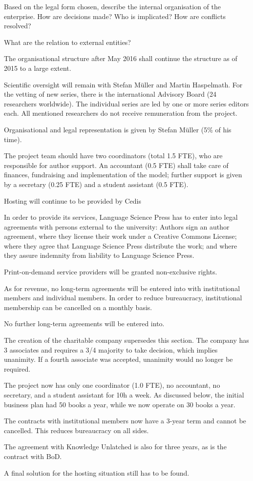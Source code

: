 \documentclass[nonflat,smallfont
]{langsci/langscibook}
\newcommand{\background}[1]{ 
  \vspace{5mm}
  \renewcommand{\tblslinecolour}{lsDarkBlue}
  \tblssy[red]{explore2}{Background}{\vspace*{-5mm}#1}
}
\newcommand{\langscisolution}[1]{
  \renewcommand{\tblslinecolour}{lsLightBlue}
  \tblssy{langsci}{LangSci solution}{\vspace*{-5mm}#1}
}
\newcommand{\evaluation}[1]{
  \renewcommand{\tblslinecolour}{lsLightOrange}
  \tblssy{receipt}{Evaluation}{\vspace*{-5mm}#1}
}
\renewcommand{\tblssy}[4][black!12]{%
  \renewcommand{\langscisymbol}{#2}\renewcommand{\tblsboxcolor}{#1}
  \begin{mdframed}[style=yellowexercise,frametitle={#3}]
    #4
  \end{mdframed}
}
\begin{document}
\background{Based on the legal form chosen, describe the internal organisation of the enterprise. How are decisions made? Who is implicated? How are conflicts resolved?

What are the relation to external entities?}
\langscisolution{

The organisational structure after May 2016 shall continue the structure as of 2015 to a large extent.

Scientific oversight will remain with Stefan Müller and Martin Haspelmath. For the vetting of new series, there is the international Advisory Board (24 researchers worldwide). The individual series are led by one or more series editors each. All mentioned researchers do not receive remuneration from the project. 

Organisational and legal representation is given by Stefan Müller (5\% of his time).

The project team should have two coordinators (total 1.5 FTE), who are responsible for author support. An accountant (0.5 FTE) shall take care of finances, fundraising and implementation of the model; further support is given by a secretary (0.25 FTE) and a student assistant (0.5 FTE). 

Hosting will continue to be provided by Cedis

In order to provide its services, Language Science Press has to enter into legal agreements with persons external to the university: Authors sign an author agreement, where they license their work under a Creative Commons License; where they agree that Language Science Press distribute the work; and where they assure indemnity from liability to Language Science Press.

Print-on-demand service providers will be granted non-exclu\-sive rights. 

As for revenue, no long-term agreements will be entered into with institutional members and individual members. In order to reduce bureaucracy, institutional membership can be cancelled on a monthly basis. 

No further long-term agreements will be entered into. 

}
\evaluation{
The creation of the charitable company supersedes this section. The company has 3 associates and requires a 3/4 majority to take decision, which implies unanimity. If a fourth associate was accepted, unanimity would no longer be required.

The project now has only one coordinator (1.0 FTE), no accountant, no secretary, and a student assistant for 10h a week. As discussed below, the initial business plan had 50 books a year, while we now operate on 30 books a year.

The contracts with institutional members now have a 3-year term and cannot be cancelled. This reduces bureaucracy on all sides. 

The agreement with Knowledge Unlatched is also for three years, as is the contract with BoD.

A final solution for the hosting situation still has to be found.
}
\end{document}
